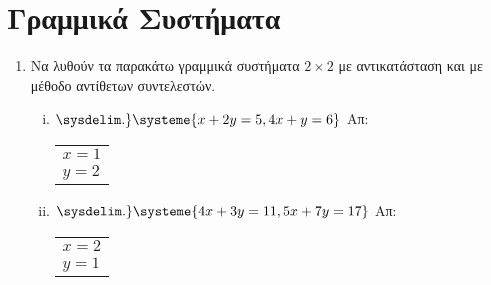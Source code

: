 \documentclass[a4paper,table]{report}
\begin{document}
\section*{Γραμμικά Συστήματα}

\begin{enumerate}

  \item Να λυθούν τα παρακάτω γραμμικά συστήματα $ 2 \times 2 $ με αντικατάσταση και με 
    μέθοδο αντίθετων συντελεστών.

    \begin{enumerate}[i)]
      \item $ 
      \sysdelim.\}
      \systeme{
        x + 2y = 5, 
        4x + y = 6
      } $ 
      \hfill Απ: 
      \begin{tabular}{l}  
        $x=1 $ \\ 
        $y=2 $ 
      \end{tabular}

    \item $ 
    \sysdelim.\}
    \systeme{
      4x+3y=11,
      5x+7y=17
    } $ 
    \hfill Απ: 
    \begin{tabular}{l}  
      $x=2 $ \\ 
      $y=1 $ 
    \end{tabular}
\end{enumerate}

\end{enumerate}
\end{document}
